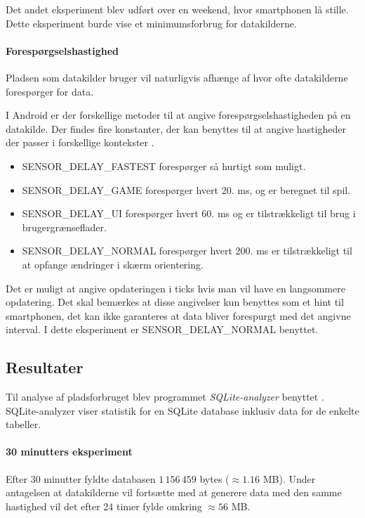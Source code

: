 Det andet eksperiment blev udført over en weekend, hvor smartphonen lå stille.
Dette eksperiment burde vise et minimumsforbrug for datakilderne.

\paragraph{Forespørgselshastighed}
Pladsen som datakilder bruger vil naturligvis afhænge af hvor ofte datakilderne forespørger for data.

I Android er der forskellige metoder til at angive forespørgselshastigheden på en datakilde.
Der findes fire konstanter, der kan benyttes til at angive hastigheder der passer i forskellige kontekster \citep{sensormonitor}.

\begin{itemize}
	\item SENSOR\_DELAY\_FASTEST forespørger så hurtigt som muligt.
	\item SENSOR\_DELAY\_GAME forespørger hvert 20. ms, og er beregnet til spil.
	\item SENSOR\_DELAY\_UI forespørger hvert 60. ms og er tilstrækkeligt til brug i brugergrænseflader.
	\item SENSOR\_DELAY\_NORMAL forespørger hvert 200. ms er tilstrækkeligt til at opfange ændringer i skærm orientering.
\end{itemize}

Det er muligt at angive opdateringen i ticks hvis man vil have en langsommere opdatering.
Det skal bemærkes at disse angivelser kun benyttes som et hint til smartphonen, det kan ikke garanteres at data bliver forespurgt med det angivne interval.
I dette eksperiment er SENSOR\_DELAY\_NORMAL benyttet.

\subsection{Resultater}
Til analyse af pladsforbruget blev programmet \textit{SQLite-analyzer} benyttet \citep{sqliteanalyzer}.
SQLite-analyzer viser statistik for en SQLite database inklusiv data for de enkelte tabeller.

\paragraph{30 minutters eksperiment}
Efter 30 minutter fyldte databasen $1\,156\,459$ bytes ($\approx1.16$ MB).
Under antagelsen at datakilderne vil fortsætte med at generere data med den samme hastighed vil det efter 24 timer fylde omkring $\approx56$ MB. 

